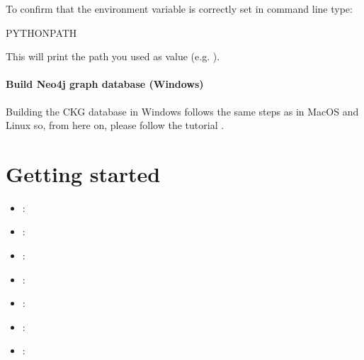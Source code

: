 \documentclass[letterpaper,10pt,english]{sphinxmanual}
\begin{document}
To confirm that the environment variable is correctly set in command line type:

\begin{sphinxVerbatim}[commandchars=\\\{\}]
\PYGZgt{}  \PYGZpc{}PYTHONPATH\PYGZpc{}
\end{sphinxVerbatim}

This will print the path you used as value (e.g. ).


\subsubsection{Build Neo4j graph database (Windows)}
\label{\detokenize{intro/getting-started-with-windows:build-neo4j-graph-database-windows}}
Building the CKG database in Windows follows the same steps as in MacOS and Linux so, from here on, please follow the tutorial {\hyperref[\detokenize{intro/getting-started-with-build:build-neo4j-graph-database}]{}}.


\chapter{Getting started}
\label{\detokenize{index:getting-started}}\begin{itemize}
\item {} 
:
{\hyperref[\detokenize{getting_started/connect-to-ckg::doc}]{}}

\item {} 
:
{\hyperref[\detokenize{getting_started/create-new-user::doc}]{}}

\item {} 
:
{\hyperref[\detokenize{getting_started/create-new-project::doc}]{}}

\item {} 
:
{\hyperref[\detokenize{getting_started/upload-data::doc}]{}}

\item {} 
:
{\hyperref[\detokenize{getting_started/data-analysis-config::doc}]{}}

\item {} 
:
{\hyperref[\detokenize{getting_started/access-report::doc}]{}}

\item {} 
:
{\hyperref[\detokenize{getting_started/notifications::doc}]{}}

\end{itemize}
\end{document}
